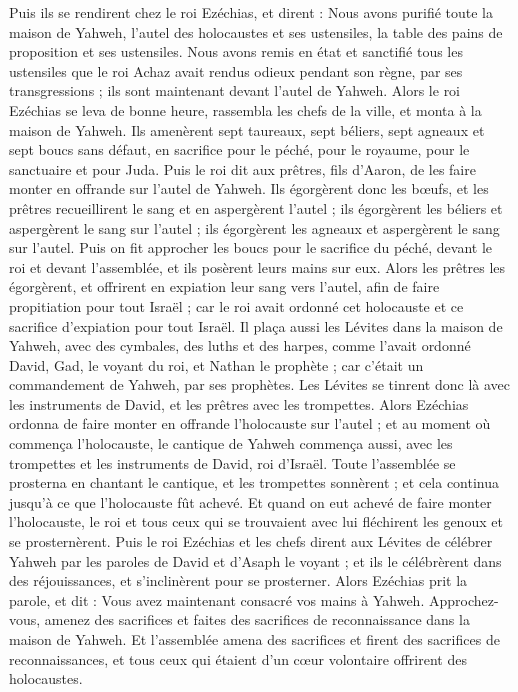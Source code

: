 \begin{multicols}{2}
Puis ils se rendirent chez le roi Ezéchias, et dirent : Nous avons purifié toute la maison de Yahweh, l'autel des holocaustes et ses ustensiles, la table des pains de proposition et ses ustensiles.
Nous avons remis en état et sanctifié tous les ustensiles que le roi Achaz avait rendus odieux pendant son règne, par ses transgressions ; ils sont maintenant devant l'autel de Yahweh.
Alors le roi Ezéchias se leva de bonne heure, rassembla les chefs de la ville, et monta à la maison de Yahweh.
Ils amenèrent sept taureaux, sept béliers, sept agneaux et sept boucs sans défaut, en sacrifice pour le péché, pour le royaume, pour le sanctuaire et pour Juda. Puis le roi dit aux prêtres, fils d'Aaron, de les faire monter en offrande sur l'autel de Yahweh.
Ils égorgèrent donc les bœufs, et les prêtres recueillirent le sang et en aspergèrent l'autel ; ils égorgèrent les béliers et aspergèrent le sang sur l'autel ; ils égorgèrent les agneaux et aspergèrent le sang sur l'autel.
Puis on fit approcher les boucs pour le sacrifice du péché, devant le roi et devant l'assemblée, et ils posèrent leurs mains sur eux.
Alors les prêtres les égorgèrent, et offrirent en expiation leur sang vers l'autel, afin de faire propitiation pour tout Israël ; car le roi avait ordonné cet holocauste et ce sacrifice d'expiation pour tout Israël.
Il plaça aussi les Lévites dans la maison de Yahweh, avec des cymbales, des luths et des harpes, comme l'avait ordonné David, Gad, le voyant du roi, et Nathan le prophète ; car c'était un commandement de Yahweh, par ses prophètes.
Les Lévites se tinrent donc là avec les instruments de David, et les prêtres avec les trompettes.
Alors Ezéchias ordonna de faire monter en offrande l'holocauste sur l'autel ; et au moment où commença l'holocauste, le cantique de Yahweh commença aussi, avec les trompettes et les instruments de David, roi d'Israël.
Toute l'assemblée se prosterna en chantant le cantique, et les trompettes sonnèrent ; et cela continua jusqu'à ce que l'holocauste fût achevé.
Et quand on eut achevé de faire monter l'holocauste, le roi et tous ceux qui se trouvaient avec lui fléchirent les genoux et se prosternèrent.
Puis le roi Ezéchias et les chefs dirent aux Lévites de célébrer Yahweh par les paroles de David et d'Asaph le voyant ; et ils le célébrèrent dans des réjouissances, et s'inclinèrent pour se prosterner.
Alors Ezéchias prit la parole, et dit : Vous avez maintenant consacré vos mains à Yahweh. Approchez-vous, amenez des sacrifices et faites des sacrifices de reconnaissance dans la maison de Yahweh. Et l'assemblée amena des sacrifices et firent des sacrifices de reconnaissances, et tous ceux qui étaient d'un cœur volontaire offrirent des holocaustes.

\end{multicols}
